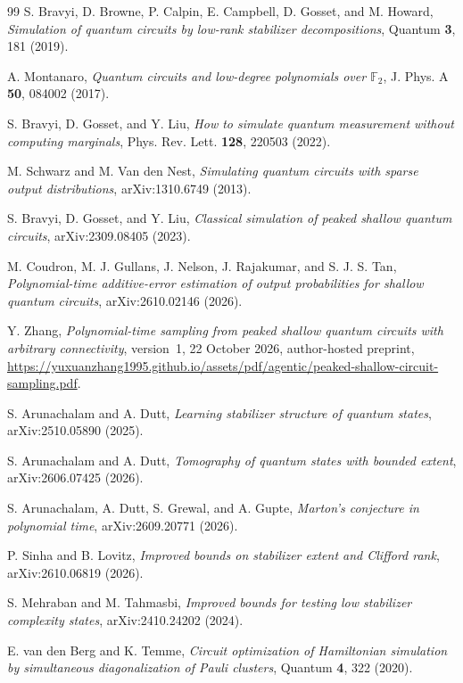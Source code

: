 \documentclass[a4paper,onecolumn,11pt,unpublished]{quantumarticle}
\theoremstyle{plain}
\theoremstyle{remark}
\begin{document}
\begin{thebibliography}{99}
 S. Bravyi, D. Browne, P. Calpin, E. Campbell, D. Gosset, and M. Howard, \emph{Simulation of quantum circuits by low-rank stabilizer decompositions}, Quantum \textbf{3}, 181 (2019).

 A. Montanaro, \emph{Quantum circuits and low-degree polynomials over $\mathbb{F}_2$}, J. Phys. A \textbf{50}, 084002 (2017).

 S. Bravyi, D. Gosset, and Y. Liu, \emph{How to simulate quantum measurement without computing marginals}, Phys. Rev. Lett. \textbf{128}, 220503 (2022).

 M. Schwarz and M. Van den Nest, \emph{Simulating quantum circuits with sparse output distributions}, arXiv:1310.6749 (2013).

 S. Bravyi, D. Gosset, and Y. Liu, \emph{Classical simulation of peaked shallow quantum circuits}, arXiv:2309.08405 (2023).

 M. Coudron, M. J. Gullans, J. Nelson, J. Rajakumar, and S. J. S. Tan, \emph{Polynomial-time additive-error estimation of output probabilities for shallow quantum circuits}, arXiv:2610.02146 (2026).

 Y. Zhang, \emph{Polynomial-time sampling from peaked shallow quantum circuits with arbitrary connectivity}, version~1, 22 October 2026, author-hosted preprint, \url{https://yuxuanzhang1995.github.io/assets/pdf/agentic/peaked-shallow-circuit-sampling.pdf}.

 S. Arunachalam and A. Dutt, \emph{Learning stabilizer structure of quantum states}, arXiv:2510.05890 (2025).

 S. Arunachalam and A. Dutt, \emph{Tomography of quantum states with bounded extent}, arXiv:2606.07425 (2026).

 S. Arunachalam, A. Dutt, S. Grewal, and A. Gupte, \emph{Marton's conjecture in polynomial time}, arXiv:2609.20771 (2026).

 P. Sinha and B. Lovitz, \emph{Improved bounds on stabilizer extent and Clifford rank}, arXiv:2610.06819 (2026).

 S. Mehraban and M. Tahmasbi, \emph{Improved bounds for testing low stabilizer complexity states}, arXiv:2410.24202 (2024).

 E. van den Berg and K. Temme, \emph{Circuit optimization of Hamiltonian simulation by simultaneous diagonalization of Pauli clusters}, Quantum \textbf{4}, 322 (2020).

\end{thebibliography}
\end{document}
